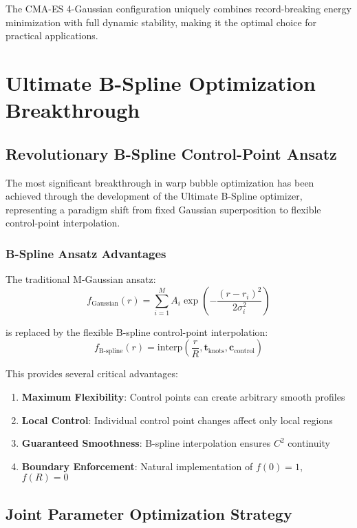 \documentclass[11pt]{article}
\begin{document}
The CMA-ES 4-Gaussian configuration uniquely combines record-breaking energy minimization with full dynamic stability, making it the optimal choice for practical applications.

\section{Ultimate B-Spline Optimization Breakthrough}

\subsection{Revolutionary B-Spline Control-Point Ansatz}

The most significant breakthrough in warp bubble optimization has been achieved through the development of the Ultimate B-Spline optimizer, representing a paradigm shift from fixed Gaussian superposition to flexible control-point interpolation.

\subsubsection{B-Spline Ansatz Advantages}

The traditional M-Gaussian ansatz:
\begin{equation}
f_{\text{Gaussian}}(r) = \sum_{i=1}^{M} A_i \exp\left(-\frac{(r-r_i)^2}{2\sigma_i^2}\right)
\end{equation}

is replaced by the flexible B-spline control-point interpolation:
\begin{equation}
f_{\text{B-spline}}(r) = \text{interp}\left(\frac{r}{R}, \mathbf{t}_{\text{knots}}, \mathbf{c}_{\text{control}}\right)
\end{equation}

This provides several critical advantages:
\begin{enumerate}
\item \textbf{Maximum Flexibility}: Control points can create arbitrary smooth profiles
\item \textbf{Local Control}: Individual control point changes affect only local regions
\item \textbf{Guaranteed Smoothness}: B-spline interpolation ensures $C^2$ continuity
\item \textbf{Boundary Enforcement}: Natural implementation of $f(0) = 1$, $f(R) = 0$
\end{enumerate}

\subsection{Joint Parameter Optimization Strategy}
\end{document}
